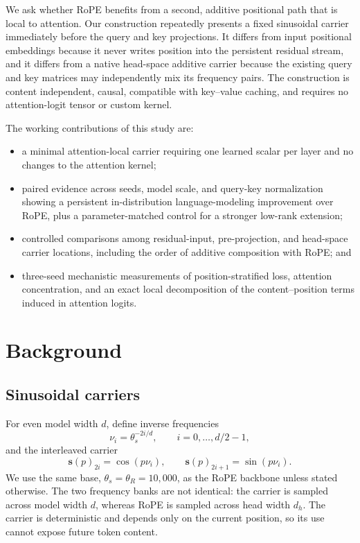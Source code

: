 \documentclass{article}
\begin{document}
We ask whether RoPE benefits from a second, additive positional path that is
local to attention. Our construction repeatedly presents a fixed sinusoidal
carrier immediately before the query and key projections. It differs from
input positional embeddings because it never writes position into the
persistent residual stream, and it differs from a native head-space additive
carrier because the existing query and key matrices may independently mix its
frequency pairs. The construction is content independent, causal, compatible
with key--value caching, and requires no attention-logit tensor or custom
kernel.

The working contributions of this study are:
\begin{itemize}
    \item a minimal attention-local carrier requiring one learned scalar per
    layer and no changes to the attention kernel;
    \item paired evidence across seeds, model scale, and query-key
    normalization showing a persistent in-distribution language-modeling
    improvement over RoPE, plus a parameter-matched control for a stronger
    low-rank extension;
    \item controlled comparisons among residual-input, pre-projection, and
    head-space carrier locations, including the order of additive composition
    with RoPE; and
    \item three-seed mechanistic measurements of position-stratified loss,
    attention concentration, and an exact local decomposition of the
    content--position terms induced in attention logits.
\end{itemize}

\section{Background}

\subsection{Sinusoidal carriers}

For even model width $d$, define inverse frequencies
\begin{equation}
    \nu_i = \theta_s^{-2i/d}, \qquad i=0,\ldots,d/2-1,
\end{equation}
and the interleaved carrier
\begin{equation}
    \mathbf{s}(p)_{2i}=\cos(p\nu_i), \qquad
    \mathbf{s}(p)_{2i+1}=\sin(p\nu_i).
    \label{eq:carrier}
\end{equation}
We use the same base, $\theta_s=\theta_R=10{,}000$, as the RoPE backbone unless
stated otherwise. The two frequency banks are not identical: the carrier is sampled
across model width $d$, whereas RoPE is sampled across head width $d_h$. The
carrier is deterministic and depends only on the current position, so its use
cannot expose future token content.
\end{document}
